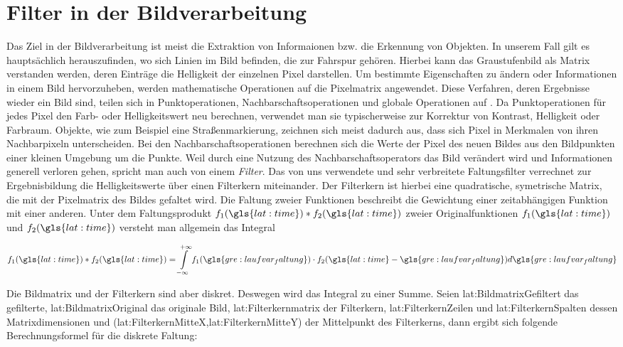 \section{Filter in der Bildverarbeitung} \label{sec:filter}

Das Ziel in der Bildverarbeitung ist meist die Extraktion von Informaionen bzw. die Erkennung von Objekten. In unserem Fall gilt es hauptsächlich herauszufinden, wo sich Linien im Bild befinden, die zur Fahrspur gehören. Hierbei kann das Graustufenbild als Matrix verstanden werden, deren Einträge die Helligkeit der einzelnen Pixel darstellen. Um bestimmte Eigenschaften zu ändern oder Informationen in einem Bild hervorzuheben, werden mathematische Operationen auf die Pixelmatrix angewendet. Diese Verfahren, deren Ergebnisse wieder ein Bild sind, teilen sich in Punktoperationen, Nachbarschaftsoperationen und globale Operationen auf \autocite{jaehneDigitaleBildverarbeitungMit2005}. Da Punktoperationen für jedes Pixel den Farb- oder Helligkeitswert neu berechnen, verwendet man sie typischerweise zur Korrektur von Kontrast, Helligkeit oder Farbraum. Objekte, wie zum Beispiel eine Straßenmarkierung, zeichnen sich meist dadurch aus, dass sich Pixel in Merkmalen von ihren Nachbarpixeln unterscheiden. Bei den Nachbarschaftsoperationen berechnen sich die Werte der Pixel des neuen Bildes aus den Bildpunkten einer kleinen Umgebung um die Punkte. Weil durch eine Nutzung des Nachbarschaftsoperators das Bild verändert wird und Informationen generell verloren gehen, spricht man auch von einem \emph{Filter}. Das von uns verwendete und sehr verbreitete Faltungsfilter verrechnet zur Ergebnisbildung die Helligkeitswerte über einen Filterkern miteinander. Der Filterkern ist hierbei eine quadratische, symetrische Matrix, die mit der Pixelmatrix des Bildes gefaltet wird. Die Faltung zweier Funktionen beschreibt die Gewichtung einer zeitabhängigen Funktion mit einer anderen. Unter dem Faltungsprodukt \( f_1(\gls{lat:time}) \ast f_2(\gls{lat:time}) \) zweier Originalfunktionen \(f_1(\gls{lat:time}) \) und \(f_2(\gls{lat:time}) \) versteht man allgemein das Integral \autocite{papulaMathematikFuerIngenieure}

\begin{equation}
f_1(\gls{lat:time}) \ast f_2(\gls{lat:time}) = \int \limits_{-\infty}^{+\infty} f_1(\gls{gre:laufvar_faltung}) \cdot f_2(\gls{lat:time}-\gls{gre:laufvar_faltung})d\gls{gre:laufvar_faltung}
\end{equation}

 Die Bildmatrix und der Filterkern sind aber diskret. Deswegen wird das Integral zu einer Summe. Seien \gls{lat:BildmatrixGefiltert} das gefilterte, \gls{lat:BildmatrixOriginal} das originale Bild, \gls{lat:Filterkernmatrix} der Filterkern, \gls{lat:FilterkernZeilen} und \gls{lat:FilterkernSpalten} dessen Matrixdimensionen und (\gls{lat:FilterkernMitteX},\gls{lat:FilterkernMitteY}) der Mittelpunkt des Filterkerns, dann ergibt sich folgende Berechnungsformel für die diskrete Faltung:

